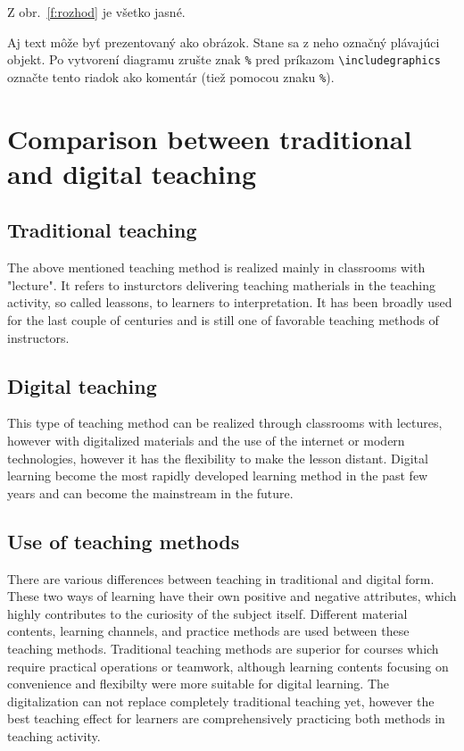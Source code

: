 \documentclass[10pt,twoside,english,a4paper]{article}
\begin{document}
Z obr.~\ref{f:rozhod} je všetko jasné. 

\begin{figure*}[tbh]
\centering
Aj text môže byť prezentovaný ako obrázok. Stane sa z neho označný plávajúci objekt. Po vytvorení diagramu zrušte znak \texttt{\%} pred príkazom \verb|\includegraphics| označte tento riadok ako komentár (tiež pomocou znaku \texttt{\%}).
\caption{Rozhodujúci argument.}
\label{f:rozhod}
\end{figure*}

\section{Comparison between traditional and digital teaching}

\subsection{Traditional teaching}

	The above mentioned teaching method is realized mainly in classrooms with "lecture". It refers to insturctors delivering teaching matherials in the teaching activity, so called leassons, to learners to interpretation. It has been broadly used for the last couple of centuries and is still one of favorable teaching methods of instructors.

\subsection{Digital teaching}

	This type of teaching method can be realized through classrooms with lectures, however with digitalized materials and the use of the internet or modern technologies, however it has the flexibility to make the lesson distant. Digital learning become the most rapidly developed learning method in the past few years and can become the mainstream in the future.

\subsection{Use of teaching methods}

	There are various differences between teaching in traditional and digital form. These two ways of learning have their own positive and negative attributes, which highly contributes to the curiosity of the subject itself. Different material contents, learning channels, and practice methods are used between these teaching methods. Traditional teaching methods are superior for courses which require practical operations or teamwork, although learning contents focusing on convenience and flexibilty were more suitable for digital  learning. The digitalization can not replace completely traditional teaching yet, however the best teaching effect for learners are comprehensively practicing both methods in teaching activity.
\end{document}
